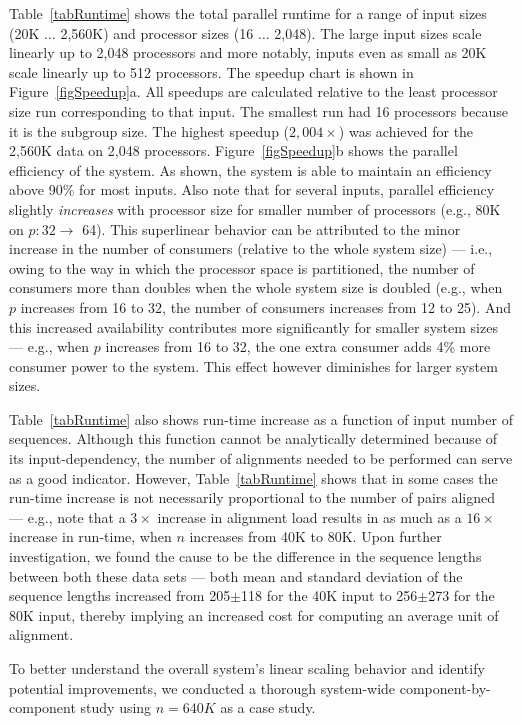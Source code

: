 \documentclass[10pt,journal,letterpaper,compsoc]{IEEEtran}
\begin{document}
Table~\ref{tabRuntime} shows the total parallel runtime for a range of input sizes (20K $\ldots$ 2,560K) and processor sizes (16 $\ldots$ 2,048). The large input sizes scale linearly up to 2,048 processors and more notably, inputs even as small as 20K scale linearly up to 512 processors. The speedup chart is shown in Figure~\ref{figSpeedup}a. All speedups are calculated relative to the least processor size run corresponding to that input. The smallest run had 16 processors because it is the subgroup size. The highest speedup ($2,004\times$) was achieved for the 2,560K data on 2,048 processors. Figure~\ref{figSpeedup}b shows the parallel efficiency of the system. As shown, the system is able to maintain an efficiency above 90\% for most inputs. Also note that for several inputs, parallel efficiency slightly \emph{increases} with processor size for smaller number of processors (e.g., 80K on $p:32\rightarrow$ 64). This superlinear behavior can be attributed to the minor increase in the number of consumers (relative to the whole system size) --- i.e., owing to the way in which the processor space is partitioned, the number of consumers more than doubles when the whole system size is doubled (e.g., when $p$ increases from 16 to 32, the number of consumers increases from 12 to 25). And this increased availability contributes more significantly for smaller system sizes --- e.g., when $p$ increases from 16 to 32, the one extra consumer adds 4\% more consumer power to the system. This effect however diminishes for larger system sizes.


Table~\ref{tabRuntime} also shows run-time increase as a function of input number of sequences. Although this function cannot be analytically determined because of its input-dependency, the number of alignments needed to be performed can serve as a good indicator. However, Table~\ref{tabRuntime} shows that in some cases the run-time increase is not necessarily proportional to the number of pairs aligned --- e.g., note that a $3\times$ increase in alignment load results in as much as a $16\times$ increase in run-time, when $n$ increases from 40K to 80K. Upon further investigation, we found the cause to be the difference in the sequence lengths between both these data sets --- both mean and standard deviation of the sequence lengths increased from 205$\pm$118 for the 40K input to 256$\pm$273 for the 80K input, thereby implying an increased cost for computing an average unit of alignment. 

To better understand the overall system's linear scaling behavior and identify potential improvements, we conducted a thorough system-wide component-by-component study using $n=640K$ as a case study. 
\end{document}
